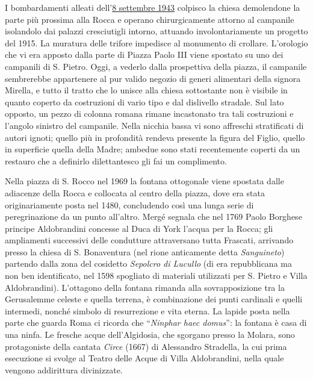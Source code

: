\documentclass[
  letterpaper,
  DIV=11,
  numbers=noendperiod]{scrartcl}
\begin{document}
I bombardamenti alleati
dell'\href{2016-09-07-8-settembre-frascati-tuscolo-comandini.html}{8
settembre 1943} colpisco la chiesa demolendone la parte più prossima
alla Rocca e operano chirurgicamente attorno al campanile isolandolo dai
palazzi cresciutigli intorno, attuando involontariamente un progetto del
1915. La muratura delle trifore impedisce al monumento di crollare.
L'orologio che vi era apposto dalla parte di Piazza Paolo III viene
spostato su uno dei campanili di S. Pietro. Oggi, a vederlo dalla
prospettiva della piazza, il campanile sembrerebbe appartenere al pur
valido negozio di generi alimentari della signora Mirella, e tutto il
tratto che lo unisce alla chiesa sottostante non è visibile in quanto
coperto da costruzioni di vario tipo e dal dislivello stradale. Sul lato
opposto, un pezzo di colonna romana rimane incastonato tra tali
costruzioni e l'angolo sinistro del campanile. Nella nicchia bassa vi
sono affreschi stratificati di autori ignoti; quello più in profondità
rendeva presente la figura del Figlio, quello in superficie quella della
Madre; ambedue sono stati recentemente coperti da un restauro che a
definirlo dilettantesco gli fai un complimento.

Nella piazza di S. Rocco nel 1969 la fontana ottogonale viene spostata
dalle adiacenze della Rocca e collocata al centro della piazza, dove era
stata originariamente posta nel 1480, concludendo così una lunga serie
di peregrinazione da un punto all'altro. Mergé segnala che nel 1769
Paolo Borghese principe Aldobrandini concesse al Duca di York l'acqua
per la Rocca; gli ampliamenti successivi delle condutture attraversano
tutta Frascati, arrivando presso la chiesa di S. Bonaventura (nel rione
anticamente detta \emph{Sanguineto}) partendo dalla zona del cosidetto
\emph{Sepolcro di Lucullo} (di era repubblicana ma non ben identificato,
nel 1598 spogliato di materiali utilizzati per S. Pietro e Villa
Aldobrandini). L'ottagono della fontana rimanda alla sovrapposizione tra
la Gerusalemme celeste e quella terrena, è combinazione dei punti
cardinali e quelli intermedi, nonché simbolo di resurrezione e vita
eterna. La lapide posta nella parte che guarda Roma ci ricorda che
``\emph{Ninphar haec domus}'': la fontana è casa di una ninfa. Le
fresche acque dell'Algidosia, che sgorgano presso la Molara, sono
protagoniste della cantata \emph{Circe} (1667) di Alessandro Stradella,
la cui prima esecuzione si svolge al Teatro delle Acque di Villa
Aldobrandini, nella quale vengono addirittura divinizzate.
\end{document}
